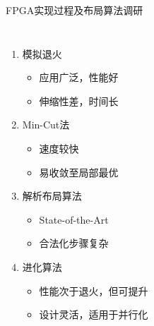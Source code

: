 \documentclass[10pt]{beamer}
\begin{document}
\begin{frame}{FPGA实现过程及布局算法调研}
\begin{columns}[T, onlytextwidth]
      \begin{enumerate}
        \item 模拟退火 
        \begin{itemize}
          \item 应用广泛，性能好
          \item 伸缩性差，时间长
        \end{itemize}
        \item Min-Cut法 
        \begin{itemize}
          \item 速度较快
          \item 易收敛至局部最优
        \end{itemize}
        \item 解析布局算法 
        \begin{itemize}
          \item State-of-the-Art
          \item 合法化步骤复杂
        \end{itemize}
        \item 进化算法 
        \begin{itemize}
          \item 性能次于退火，但可提升
          \item 设计灵活，适用于并行化
        \end{itemize}
      \end{enumerate}

  \end{columns}

\end{frame}
\end{document}
